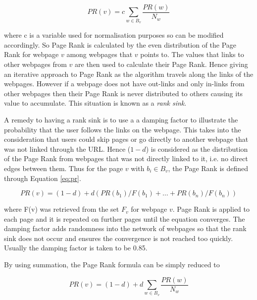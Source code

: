 \begin{equation}
PR(v) = c\sum_{w \in B_v}\frac{PR(w)}{N_w}
\end{equation}

where c is a variable used for normalisation purposes so can be modified accordingly. So Page Rank is calculated by the even distribution of the Page Rank for webpage $v$ among webpages that $v$ points to. The values that links to other webpages from $v$ are then used to calculate their Page Rank. Hence giving an iterative approach to Page Rank as the algorithm travels along the links of the webpages. However if a webpage does not have out-links and only in-links from other webpages then their Page Rank is never distributed to others causing its value to accumulate. This situation is known as a \emph{rank sink}.

A remedy to having a rank sink is to use a a damping factor to illustrate the probability that the user follows the links on the webpage. This takes into the consideration that users could skip pages or go directly to another webpage that was not linked through the URL. Hence ($1-d$) is considered as the distribution of the Page Rank from webpages that was not directly linked to it, i.e. no direct edges between them. Thus for the page $v$ with $b_i \in B_v$, the Page Rank\cite{brin1998anatomy} is defined through Equation \ref{eq:pr}.

\begin{equation} \label{eq:pr}
PR(v) = (1-d) + d (PR(b_1)/F(b_1) + … + PR(b_n)/F(b_n))
\end{equation}

where F(v) was retrieved from the set $F_v$ for webpage $v$. Page Rank is applied to each page and it is repeated on further pages until the equation converges. The damping factor adds randomness into the network of webpages so that the rank sink does not occur and ensures the convergence is not reached too quickly. Usually the damping factor is taken to be 0.85. 

By using summation, the Page Rank formula can be simply reduced to

\begin{equation}
PR(v) = (1 - d) + d\sum_{w \in B_v}\frac{PR(w)}{N_w}
\end{equation}

